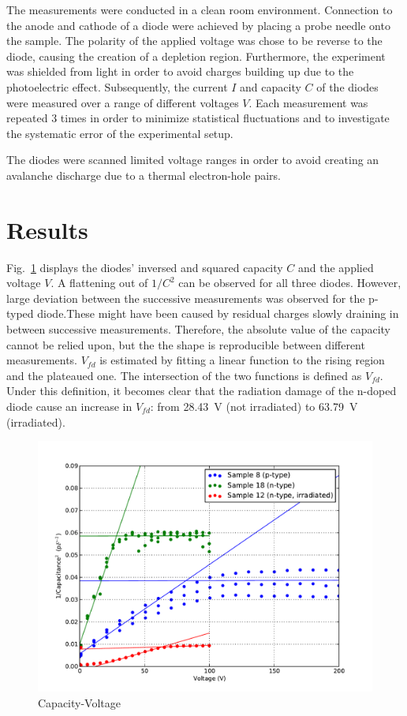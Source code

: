 \documentclass[11pt]{article}
\begin{document}
The measurements were conducted in a clean room environment. 
Connection to the anode and cathode of a diode were achieved by placing a probe needle onto the sample.
The polarity of the applied voltage was chose to be reverse to the diode, causing the creation of a depletion region.
Furthermore, the experiment was shielded from light in order to avoid charges building up due to the photoelectric effect. Subsequently, the current $I$ and capacity $C$ of the diodes were measured over a range of different voltages $V$. Each measurement was repeated 3 times in order to minimize statistical fluctuations and to investigate the systematic error of the experimental setup.

The diodes were scanned limited voltage ranges in order to avoid creating an avalanche discharge due to a thermal electron-hole pairs.

\section{Results}
Fig.~\ref{fig:cv} displays the  diodes' inversed and squared capacity $C$ and the applied voltage $V$.
A flattening out of $1/C^2$ can be observed for all three diodes.
However, large deviation between the successive measurements was observed for the p-typed diode.These might have been caused by residual charges slowly draining in between successive measurements.
Therefore, the absolute value of the capacity cannot be relied upon, but the the shape is reproducible between different measurements.
$V_{fd}$ is estimated by fitting a linear function to the rising region and the plateaued one. The intersection of the two functions is defined as $V_{fd}$.
Under this definition, it becomes clear that the radiation damage of the n-doped diode cause an increase in $V_{fd}$: from \SI{28.43}{V} (not irradiated) to \SI{63.79}{V} (irradiated).
\label{sec:results}
\begin{figure}
  \centering
  \includegraphics[width=\textwidth]{./figures/cv.pdf}  
  \caption{Capacity-Voltage }
  \label{fig:cv}
\end{figure}
\end{document}
